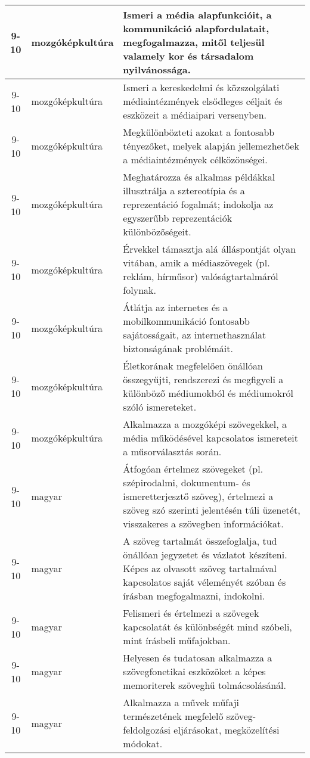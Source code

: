 \begin{small}
\begin{longtable}{c | p{2cm} |  p{11cm} }
              9-10 & mozgóképkultúra & Ismeri a média alapfunkcióit, a kommunikáció alapfordulatait, megfogalmazza, mitől teljesül valamely kor és társadalom nyilvánossága. \\ \hline
              9-10 & mozgóképkultúra & Ismeri a kereskedelmi és közszolgálati médiaintézmények elsődleges céljait és eszközeit a médiaipari versenyben. \\ \hline
              9-10 & mozgóképkultúra & Megkülönbözteti azokat a fontosabb tényezőket, melyek alapján jellemezhetőek a médiaintézmények célközönségei. \\ \hline
              9-10 & mozgóképkultúra & Meghatározza és alkalmas példákkal illusztrálja a sztereotípia és a reprezentáció fogalmát; indokolja az egyszerűbb reprezentációk különbözőségeit. \\ \hline
              9-10 & mozgóképkultúra & Érvekkel támasztja alá álláspontját olyan vitában, amik a médiaszövegek (pl. reklám, hírműsor) valóságtartalmáról folynak. \\ \hline
              9-10 & mozgóképkultúra & Átlátja az internetes és a mobilkommunikáció fontosabb sajátosságait, az internethasználat biztonságának problémáit. \\ \hline
              9-10 & mozgóképkultúra & Életkorának megfelelően önállóan összegyűjti, rendszerezi és megfigyeli a különböző  médiumokból és médiumokról szóló ismereteket. \\ \hline
              9-10 & mozgóképkultúra & Alkalmazza a mozgóképi szövegekkel, a média működésével kapcsolatos ismereteit a műsorválasztás során.  \\ \hline
              9-10 & magyar & Átfogóan értelmez szövegeket (pl. szépirodalmi, dokumentum- és ismeretterjesztő szöveg), értelmezi a szöveg szó szerinti jelentésén túli üzenetét, visszakeres a szövegben információkat. \\ \hline
              9-10 & magyar & A szöveg tartalmát összefoglalja, tud önállóan jegyzetet és vázlatot készíteni. Képes az olvasott szöveg tartalmával kapcsolatos saját véleményét szóban és írásban megfogalmazni, indokolni. \\ \hline
              9-10 & magyar & Felismeri és értelmezi a szövegek kapcsolatát és különbségét mind szóbeli, mint írásbeli műfajokban. \\ \hline
              9-10 & magyar & Helyesen és tudatosan alkalmazza a szövegfonetikai eszközöket a képes memoriterek szöveghű tolmácsolásánál. \\ \hline
              9-10 & magyar & Alkalmazza a művek műfaji természetének megfelelő szöveg-feldolgozási eljárásokat, megközelítési módokat. \\ \hline

\end{longtable}
\end{small}
